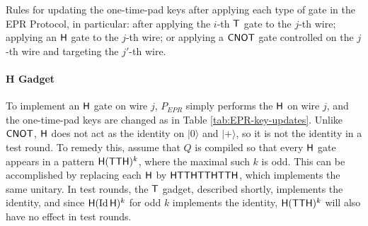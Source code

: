 \documentclass[11pt,letter]{article}
\theoremstyle{remark}
\theoremstyle{definition}
\newcommand{\ket}[1]{|#1\rangle}
\newcommand{\Id}{\ensuremath{\mathop{\rm Id}\nolimits}}
\begin{document}
\begin{table}[t]


\caption{Rules for updating the one-time-pad keys after applying each type of gate in the EPR Protocol, in particular: after applying the $i$-th $\sf T$ gate to the $j$-th wire; applying an $\sf H$ gate to the $j$-th wire; or applying a $\sf CNOT$ gate controlled on the $j$-th wire and targeting the $j'$-th wire. 
}\label{tab:EPR-key-updates}
\end{table}


\paragraph{H Gadget} To implement an $\sf H$ gate on wire $j$, $P_{EPR}$ simply performs the $\sf H$ on wire $j$, and the one-time-pad keys are changed as in Table \ref{tab:EPR-key-updates}. Unlike $\sf CNOT$, $\sf H$ does not act as the identity on $\ket{0}$ and $\ket{+}$, so it is not the identity in a test round. To remedy this, assume that $Q$ is compiled so that every $\sf H$ gate appears in a pattern ${\sf H}({\sf TTH})^k$, where the maximal such $k$ is odd. This can be accomplished by replacing each $\sf H$ by $\sf HTTHTTHTTH$, which implements the same unitary. In test rounds, the $\sf T$ gadget, described shortly, implements the identity, and since ${\sf H}(\Id {\sf H})^k$ for odd $k$ implements the identity, ${\sf H}({\sf TTH})^k$ will also have no effect in test rounds. 
\end{document}
